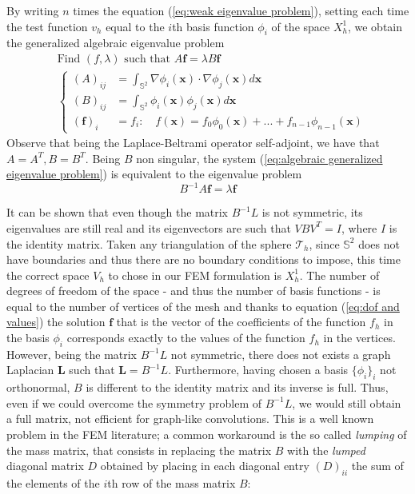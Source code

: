 By writing $n$ times the equation (\ref{eq:weak eigenvalue problem}), setting each time the test function $v_h$ equal to the $i$th basis function $\phi_i$ of the space $X_h^1$, we obtain the generalized algebraic eigenvalue problem
\begin{align}\label{eq:algebraic generalized eigenvalue problem}
	&\text{Find }(f,\lambda)\text{ such that }A\mathbf f = \lambda B \mathbf f\\
	&\begin{cases}
	(A)_{ij} &= \int_{\mathbb S^2}\nabla \phi_i(\mathbf{x})\cdot \nabla \phi_j(\mathbf{x})d\mathbf{x}\\
	(B)_{ij} &= \int_{\mathbb S^2} \phi_i(\mathbf{x}) \phi_j(\mathbf{x})d\mathbf{x}\\
	(\mathbf f)_i &= f_i:\quad f(\mathbf x) = f_0\phi_0(\mathbf x)+ ... + f_{n-1}\phi_{n-1}(\mathbf x) 
	\end{cases}
\end{align}
Observe that being the Laplace-Beltrami operator self-adjoint, we have that $A=A^T, B=B^T$. Being $B$ non singular, the system (\ref{eq:algebraic generalized eigenvalue problem}) is equivalent to the eigenvalue problem
\begin{equation}\label{eq:algebraic  eigenvalue problem}
B^{-1}A\mathbf f = \lambda \mathbf f
\end{equation}

It can be shown \cite{Strang} that even though the matrix $B^{-1}L$ is not symmetric, its eigenvalues are still real and its eigenvectors are such that $VBV^T=I$, where $I$ is the identity matrix.
Taken any triangulation of the sphere $\mathcal T_h$, since $\mathbb S^2$ does not have boundaries and thus there are no boundary conditions to impose, this time the correct space $V_h$ to chose in our FEM formulation is $X^1_h$. The number of degrees of freedom of the space - and thus the number of basis functions - is equal to the number of vertices of the mesh and thanks to equation (\ref{eq:dof and values}) the solution $\mathbf f$ that is the vector of the coefficients of the function $f_h$ in the basis $\phi_i$ corresponds exactly to the values of the function $f_h$ in the vertices. However, being the matrix $B^{-1}L$ not symmetric, there does not exists a graph Laplacian $\mathbf L$ such that $\mathbf L = B^{-1}L$. Furthermore, having chosen a basis $\{\phi_i\}_i$ not orthonormal, $B$ is different to the identity matrix and its inverse is full. Thus, even if we could overcome the symmetry problem of $B^{-1}L$, we would still obtain a full matrix, not efficient for graph-like convolutions. This is a well known problem in the FEM literature; a common workaround is the so called \textit{lumping} of the mass matrix, that consists in replacing the matrix $B$ with the \textit{lumped} diagonal matrix $D$ obtained by placing in each diagonal entry $(D)_{ii}$ the sum of the elements of the $i$th row of the mass matrix $B$:

